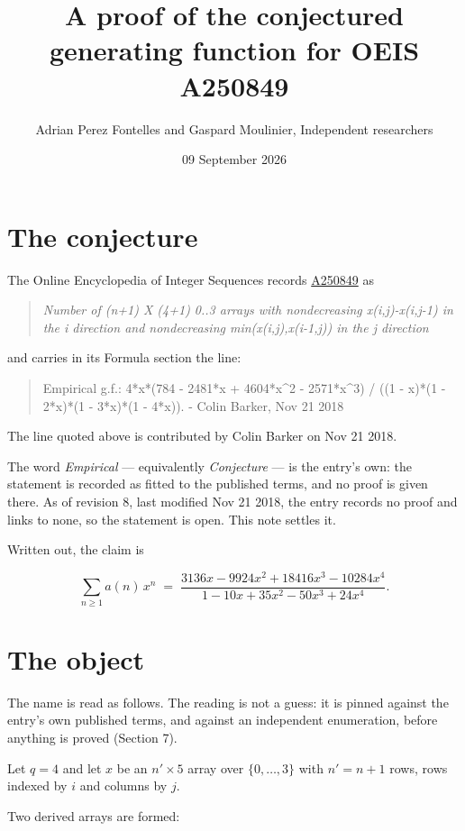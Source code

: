 \documentclass[11pt]{article}
\title{A proof of the conjectured generating function for OEIS A250849}
\author{Adrian Perez Fontelles and Gaspard Moulinier, Independent researchers}
\date{09 September 2026}
\theoremstyle{definition}
\begin{document}
\maketitle
\section{The conjecture}

The Online Encyclopedia of Integer Sequences records \href{https://oeis.org/A250849}{A250849} as

\begin{quote}\itshape Number of (n+1) X (4+1) 0..3 arrays with nondecreasing x(i,j)-x(i,j-1) in the i direction and nondecreasing min(x(i,j),x(i-1,j)) in the j direction\end{quote}

and carries in its Formula section the line:

\begin{quote}\ttfamily Empirical g.f.: 4*x*(784 - 2481*x + 4604*x\textasciicircum{}2 - 2571*x\textasciicircum{}3) / ((1 - x)*(1 - 2*x)*(1 - 3*x)*(1 - 4*x)). - Colin Barker, Nov 21 2018\end{quote}

The line quoted above is contributed by Colin Barker on Nov 21 2018.

The word {\itshape Empirical} --- equivalently {\itshape Conjecture} --- is the entry's own: the statement is recorded as fitted to the published terms, and no proof is given there. As of revision 8, last modified Nov 21 2018, the entry records no proof and links to none, so the statement is open. This note settles it.

Written out, the claim is

\[\sum_{n \ge 1} a(n)\,x^n \;=\; \frac{3136x - 9924x^{2} + 18416x^{3} - 10284x^{4}}{1 - 10x + 35x^{2} - 50x^{3} + 24x^{4}}.\]

\section{The object}

The name is read as follows. The reading is not a guess: it is pinned against the entry's own published terms, and against an independent enumeration, before anything is proved (Section 7).

Let $q = 4$ and let $x$ be an $n' \times 5$ array over $\{0,\dots,3\}$ with $n' = n + 1$ rows, rows indexed by $i$ and columns by $j$.

Two derived arrays are formed:
\end{document}
